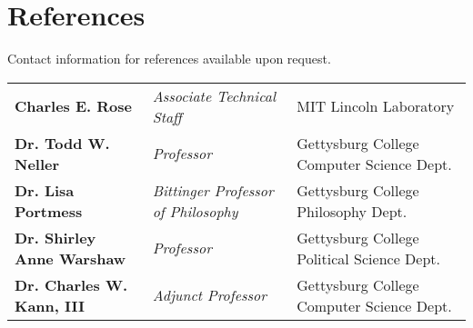 \documentclass[11pt]{article}
\begin{document}
\section*{References}
Contact information for references available upon request. \\

\begin{tabular}{ l l l }
	\textbf{Charles E. Rose} & \textit{Associate Technical Staff} & MIT Lincoln Laboratory \\
	\textbf{Dr. Todd W. Neller} & \textit{Professor} & Gettysburg College Computer Science Dept. \\
	\textbf{Dr. Lisa Portmess} & \textit{Bittinger Professor of Philosophy} & Gettysburg College Philosophy Dept. \\
	\textbf{Dr. Shirley Anne Warshaw} & \textit{Professor} & Gettysburg College Political Science Dept. \\
	\textbf{Dr. Charles W. Kann, III} & \textit{Adjunct Professor} & Gettysburg College Computer Science Dept. \\
\end{tabular}
\end{document}
